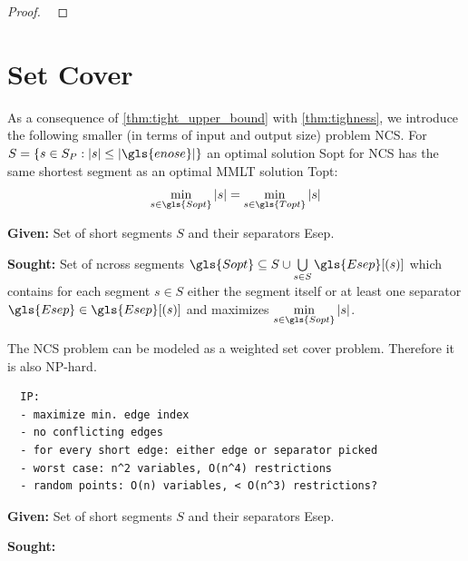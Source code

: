 \begin{proof}
  \ 
\end{proof}

\section{Set Cover}

As a consequence of \cref{thm:tight_upper_bound} with 
\cref{thm:tighness}, we introduce the following smaller (in terms
of input and output size) problem \gls{NCS}.
For \(S = \{s \in S_P : |s| \leq |\gls{enose}|\}\) an optimal 
solution \gls{Sopt} for \gls{NCS} has the same shortest segment 
as an optimal \gls{MMLT} solution \gls{Topt}:
\[
  \min\limits_{s \in \gls{Sopt}} |s|
  = \min\limits_{s \in \gls{Topt}} |s|
\]

\begin{problem}
  \hfill
  \begin{labeling}{\hspace{4em}}
    \item[\textbf{Given:}]
      Set of short segments \(S\) and their separators \gls{Esep}.
    \item[\textbf{Sought:}]
      Set of \gls{ncross} segments \(\gls{Sopt} \subseteq S \cup
      \bigcup\limits_{s \in S} \gls{Esep}[(s)] \) which contains
      for each segment \(s \in S\) either the segment itself or at
      least one separator \(\gls{Esep} \in \gls{Esep}[(s)]\) and
      maximizes \(\min\limits_{s \in \gls{Sopt}} |s|\).
  \end{labeling}
\end{problem}

The \gls{NCS} problem can be modeled as a weighted set cover problem. 
Therefore it is also NP-hard.

\begin{verbatim}
  IP:
  - maximize min. edge index
  - no conflicting edges
  - for every short edge: either edge or separator picked
  - worst case: n^2 variables, O(n^4) restrictions
  - random points: O(n) variables, < O(n^3) restrictions?
\end{verbatim}

\begin{problem}
  \hfill
  \begin{labeling}{\hspace{4em}}
    \item[\textbf{Given:}]
      Set of short segments \(S\) and their separators \gls{Esep}.  
    \item[\textbf{Sought:}]
  \end{labeling}
\end{problem}

